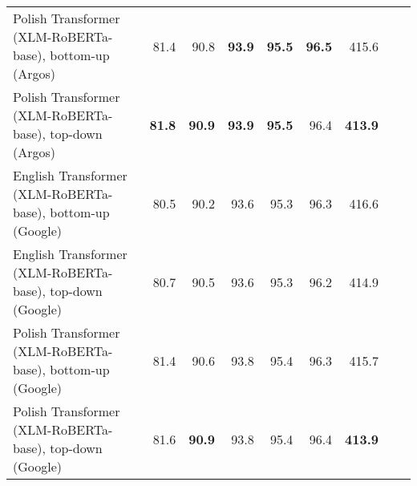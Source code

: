 \begin{table}[ht!]
{\begin{tabular}{lrrrrrrrr}
  Polish Transformer (XLM-RoBERTa-base), bottom-up (Argos) & 81.4 & 90.8 & \textbf{93.9} & \textbf{95.5} & \textbf{96.5} & 415.6 \\ 
  Polish Transformer (XLM-RoBERTa-base), top-down (Argos) & \textbf{81.8} & \textbf{90.9} & \textbf{93.9} & \textbf{95.5} & 96.4 & \textbf{413.9} \\ 
  English Transformer (XLM-RoBERTa-base), bottom-up (Google) & 80.5 & 90.2 & 93.6 & 95.3 & 96.3 & 416.6 \\ 
  English Transformer (XLM-RoBERTa-base), top-down (Google) & 80.7 & 90.5 & 93.6 & 95.3 & 96.2 & 414.9 \\ 
  Polish Transformer (XLM-RoBERTa-base), bottom-up (Google) & 81.4 & 90.6 & 93.8 & 95.4 & 96.3 & 415.7 \\ 
  Polish Transformer (XLM-RoBERTa-base), top-down (Google) & 81.6 & \textbf{90.9} & 93.8 & 95.4 & 96.4 & \textbf{413.9} \\ 
   \hline
\end{tabular}
}
\end{table}




